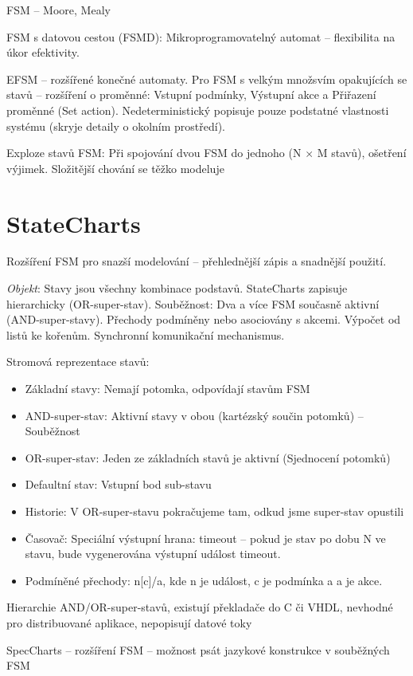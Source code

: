 \documentclass[a4paper, 11pt]{report}
\begin{document}
FSM -- Moore, Mealy

FSM s datovou cestou (FSMD): Mikroprogramovatelný automat -- flexibilita na úkor efektivity.

EFSM -- rozšířené konečné automaty. Pro FSM s velkým množsvím opakujících se stavů -- rozšíření o proměnné: Vstupní podmínky, Výstupní akce a Přiřazení proměnné (Set action). Nedeterministický popisuje pouze podstatné vlastnosti systému (skryje detaily o okolním prostředí).

Exploze stavů FSM: Při spojování dvou FSM do jednoho (N $\times$ M stavů), ošetření výjimek. Složitější chování se těžko modeluje

\section{StateCharts}
Rozšíření FSM pro snazší modelování -- přehlednější zápis a snadnější použití.

\emph{Objekt}: Stavy jsou všechny kombinace podstavů. StateCharts zapisuje hierarchicky (OR-super-stav). Souběžnost: Dva a více FSM současně aktivní (AND-super-stavy). Přechody podmíněny nebo asociovány s akcemi. Výpočet od listů ke kořenům. Synchronní komunikační mechanismus.

Stromová reprezentace stavů:
\begin{itemize}
	\item Základní stavy: Nemají potomka, odpovídají stavům FSM
	\item AND-super-stav: Aktivní stavy v obou (kartézský součin potomků) -- Souběžnost
	\item OR-super-stav: Jeden ze základních stavů je aktivní (Sjednocení potomků)
	\item Defaultní stav: Vstupní bod sub-stavu
	\item Historie: V OR-super-stavu pokračujeme tam, odkud jsme super-stav opustili
	\item Časovač: Speciální výstupní hrana: timeout -- pokud je stav po dobu N ve stavu, bude vygenerována výstupní událost timeout.
	\item Podmíněné přechody: n[c]/a, kde n je událost, c je podmínka a a je akce.
\end{itemize}

Hierarchie AND/OR-super-stavů, existují překladače do C či VHDL, nevhodné pro distribuované aplikace, nepopisují datové toky

SpecCharts -- rozšíření FSM -- možnost psát jazykové konstrukce v souběžných FSM
\end{document}
